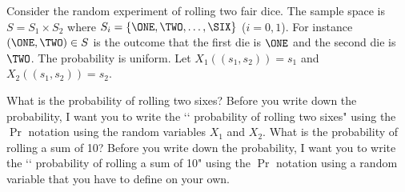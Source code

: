   Consider the random experiment of rolling two fair
  dice.
  The sample space is $S = S_1 \times S_2$ where
  $S_i = \{\ONE, \TWO, \ldots, \SIX \}$ ($i = 0, 1$).
  For instance $(\ONE, \TWO) \in S$ is the outcome that the first
  die is $\ONE$ and the second die is $\TWO$.
  The probability is uniform.
  Let $X_1((s_1, s_2)) = s_1$ and $X_2((s_1, s_2)) = s_2$.
  \begin{itemize}
    \li
    What is
    the
    probability of rolling two sixes?
    Before you write down the probability, I
    want you to write
    the
    \lq\lq
    probability of rolling two sixes"
    using the $\Pr$ notation
    using the random variables
    $X_1$ and $X_2$.
    \li
    What is the probability of rolling a sum of
    10?
    Before you write down the probability, I
    want you to write
    the
    \lq\lq
    probability of rolling a sum of 10"
    using the $\Pr$ notation
    using a random variable that you have to define on your own.
  \end{itemize}
